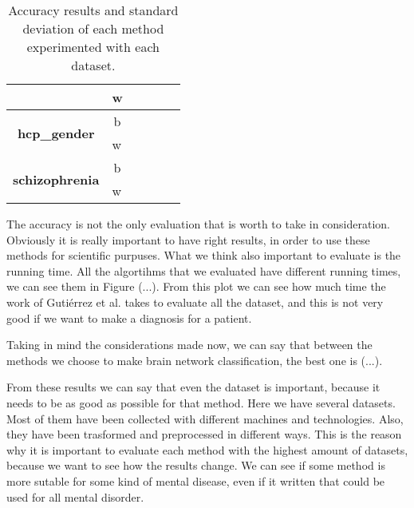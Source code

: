 \begin{table}
{\begin{tabular}{c|c|c|c|c|c}
	\cline{2-6}
	& \multicolumn{1}{l|}{w} & \multicolumn{1}{l|}{}        & \multicolumn{1}{l|}{} & \multicolumn{1}{l|}{} & \multicolumn{1}{l}{}  \\ 
	\midrule
	\multirow{2}{*}{\textbf{hcp\_gender}}   & b                      &                              &                       &                       &                       \\ 
	\cline{2-6}
	& \multicolumn{1}{l|}{w} & \multicolumn{1}{l|}{}        & \multicolumn{1}{l|}{} & \multicolumn{1}{l|}{} & \multicolumn{1}{l}{}  \\ 
	\midrule
	\multirow{2}{*}{\textbf{schizophrenia}} & b                      &                              &                       &                       &                       \\ 
	\cline{2-6}
	& \multicolumn{1}{l|}{w} & \multicolumn{1}{l|}{}        & \multicolumn{1}{l|}{} & \multicolumn{1}{l|}{} & \multicolumn{1}{l}{}  \\
	\bottomrule
\end{tabular}
}
\caption{Accuracy results and standard deviation of each method experimented with each dataset.}
\label{tab:all_results}
\end{table}

The accuracy is not the only evaluation that is worth to take in consideration. Obviously it is really important to have right results, in order to use these methods for scientific purpuses. What we think also important to evaluate is the running time. All the algortihms that we evaluated have different running times, we can see them in Figure (...). From this plot we can see how much time the work of Guti\'{e}rrez et al. \cite{GutierrezBio} takes to evaluate all the dataset, and this is not very good if we want to make a diagnosis for a patient. 
\vspace{0.5cm}

Taking in mind the considerations made now, we can say that between the methods we choose to make brain network classification, the best one is (...).

From these results we can say that even the dataset is important, because it needs to be as good as possible for that method. Here we have several datasets. Most of them have been collected with different machines and technologies. Also, they have been trasformed and preprocessed in different ways. This is the reason why it is important to evaluate each method with the highest amount of datasets, because we want to see how the results change. We can see if some method is more sutable for some kind of mental disease, even if it written that could be used for all mental disorder.
